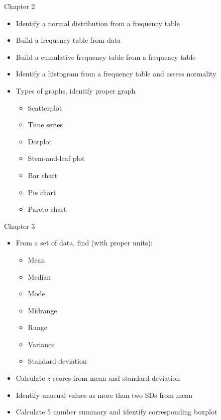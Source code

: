 \documentclass[xcolor=table]{beamer}
\begin{document}
\begin{frame}{Chapter 2}
\begin{block}{}
\large
\begin{itemize}
\item Identify a normal distribution from a frequency table
\item Build a frequency table from data
\item Build a cumulative frequency table from a frequency table
\item Identify a histogram from a frequency table and assess normality
\item Types of graphs, identify proper graph
\begin{itemize}
\item Scatterplot
\item Time series
\item Dotplot
\item Stem-and-leaf plot
\item Bar chart
\item Pie chart
\item Pareto chart
\end{itemize}
\end{itemize}
\end{block}
\end{frame}

\begin{frame}{Chapter 3}
\begin{block}{}
\large
\begin{itemize}
\item From a set of data, find (with proper units):
\begin{itemize}
\item Mean
\item Median
\item Mode
\item Midrange
\item Range
\item Variance
\item Standard deviation
\end{itemize}
\item Calculate $z$-scores from mean and standard deviation
\item Identify unusual values as more than two SDs from mean
\item Calculate 5 number summary and identify corresponding boxplot
\end{itemize}
\end{block}
\end{frame}
\end{document}
